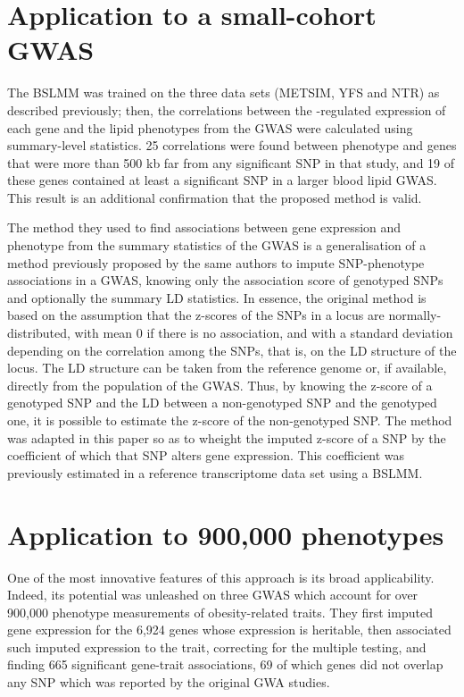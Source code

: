\documentclass[../main.tex]{subfiles}
\begin{document}
\section{Application to a small-cohort GWAS}

The BSLMM was trained on the three data sets (METSIM, YFS and NTR) as 
described previously; then, the correlations between the \cis-regulated 
expression of each gene and the lipid phenotypes from the GWAS were 
calculated using summary-level statistics. 25 correlations were found 
between phenotype and genes that were more than 500 kb far from any 
significant SNP in that study, and 19 of these genes contained at least 
a significant SNP in a larger blood lipid GWAS. This result is an 
additional confirmation that the proposed method is valid.

The method they used to find associations between gene expression and 
phenotype from the summary statistics of the GWAS is a generalisation of 
a method previously proposed by the same authors to impute SNP-phenotype 
associations in a GWAS, knowing only the association score of genotyped 
SNPs\cite{Pasaniuc2014} and optionally the summary LD statistics. In 
essence, the original method is based on the assumption that the 
z-scores of the SNPs in a locus are normally-distributed, with mean 0 
if there is no association, and with a standard deviation depending on 
the correlation among the SNPs, that is, on the LD structure of the 
locus. The LD structure can be taken from the reference genome or, if 
available, directly from the population of the GWAS. Thus, by knowing 
the z-score of a genotyped SNP and the LD between a non-genotyped SNP 
and the genotyped one, it is possible to estimate the z-score of the 
non-genotyped SNP. The method was adapted in this paper so as to wheight 
the imputed z-score of a SNP by the coefficient of which that SNP alters 
gene expression. This coefficient was previously estimated in a 
reference transcriptome data set using a BSLMM.

\section{Application to 900,000 phenotypes}

One of the most innovative features of this approach is its broad 
applicability. Indeed, its potential was unleashed on three GWAS which 
account for over 900,000 phenotype measurements of obesity-related 
traits. They first 
imputed gene expression for the 6,924 genes whose expression is 
heritable, then associated such imputed expression to the trait, 
correcting for the multiple testing, and finding 665 significant 
gene-trait associations, 69 of which genes did not overlap any SNP which 
was reported by the original GWA studies.
\end{document}
